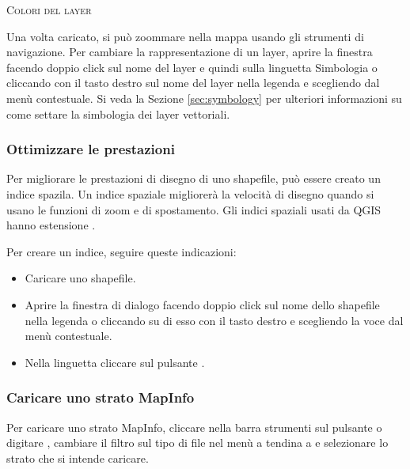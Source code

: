 \begin{Tip}\caption{\textsc{Colori del layer}}
\end{Tip}

Una volta caricato, si può zoommare nella mappa usando gli strumenti di navigazione.
Per cambiare la rappresentazione di un layer, aprire la finestra
 facendo doppio click sul nome del layer e quindi sulla
linguetta Simbologia o cliccando con il
tasto destro sul nome del layer nella legenda e scegliendo
 dal menù contestuale. Si veda la Sezione
\ref{sec:symbology} per ulteriori informazioni su come settare la simbologia
dei layer vettoriali.

\subsubsection{Ottimizzare le prestazioni}

Per migliorare le prestazioni di disegno di uno shapefile, può essere creato
un indice spazila. Un  indice spaziale
migliorerà la velocità di disegno quando si usano le funzioni di zoom e di
spostamento. Gli indici spaziali usati da QGIS hanno estensione .

Per creare un indice, seguire queste indicazioni:

\begin{itemize}
\item Caricare uno shapefile.
\item Aprire la finestra di dialogo  facendo doppio click
sul nome dello shapefile nella legenda o cliccando su di esso con il tasto
destro e scegliendo la voce  dal menù contestuale.
\item Nella linguetta  cliccare sul pulsante .
\end{itemize}

\subsubsection{Caricare uno strato MapInfo}

Per caricare uno strato MapInfo, cliccare nella barra strumenti sul pulsante
 o digitare
, cambiare il filtro sul tipo di file nel menù a tendina a
 e
selezionare lo strato che si intende caricare.

